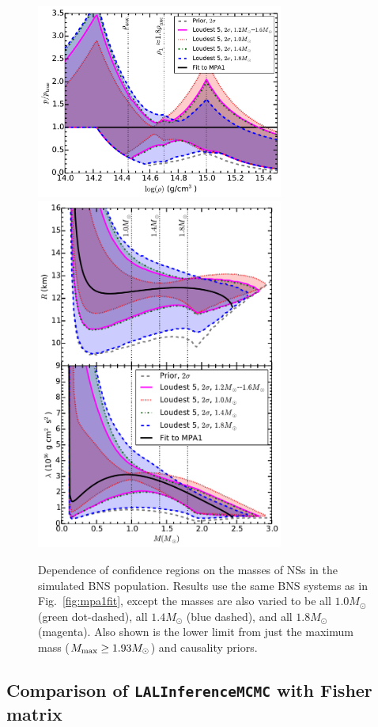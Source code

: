 \documentclass[twocolumn,prd,amssymb,aps,nofootinbib,showpacs,epsf]{revtex4}
\begin{document}
\begin{figure}[!htb]
\begin{center}
\includegraphics[width=3.2in]{LALMCMCmpa1FitTaylorF2VaryMassperror.pdf}\\
\includegraphics[width=3.2in]{LALMCMCmpa1FitTaylorF2VaryMassRadiuslambda.pdf}
\caption{Dependence of confidence regions on the masses of NSs in the simulated BNS population. Results use the same BNS systems as in Fig.~\ref{fig:mpa1fit}, except the masses are also varied to be all $1.0M_\odot$ (green dot-dashed), all $1.4M_\odot$ (blue dashed), and all $1.8M_\odot$ (magenta). Also shown is the lower limit from just the maximum mass ($M_{\rm \max} \geq 1.93M_\odot$) and causality priors.}
\label{fig:popmass}
\end{center}
\end{figure}


\subsection{Comparison of \texttt{LALInferenceMCMC} with Fisher matrix}
\label{sec:fisher}
\end{document}

